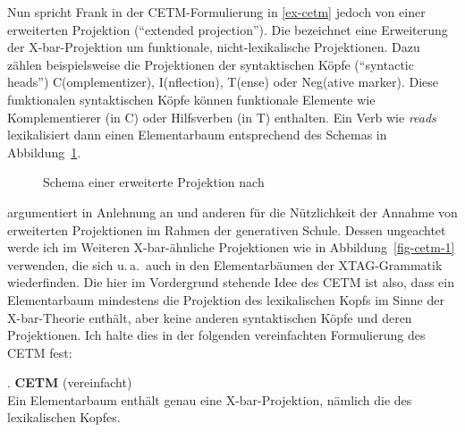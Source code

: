 Nun spricht Frank in der CETM-Formulierung in \ref{ex-cetm} jedoch von einer erweiterten Projektion ("`extended projection"'). Die  \citep{Grimshaw:91,Grimshaw:00}  bezeichnet eine Erweiterung der X-bar-Projektion um funktionale, nicht-lexikalische Projektionen. Dazu zählen beispielsweise die Projektionen der syntaktischen Köpfe ("`syntactic heads"') C(omplemen\-tizer), I(nflection), T(ense) oder Neg(ative marker). Diese funktionalen syntaktischen Köpfe können funktionale Elemente wie Komplementierer (in C) oder Hilfsverben (in T) enthalten. Ein Verb wie {\it reads} lexikalisiert dann einen Elementarbaum entsprechend des Schemas in Abbildung~\ref{fig-cetm-2}.
\begin{figure}[t]
\centering
{}
\caption{\label{fig-cetm-2}Schema einer erweiterte Projektion nach \citet[25]{Frank:02}}
\end{figure}
\citet[45ff]{Frank:02} argumentiert in Anlehnung an \cite{Grimshaw:91} und anderen für die Nützlichkeit der Annahme von erweiterten Projektionen im Rahmen der generativen Schule. Dessen ungeachtet werde ich im Weiteren X-bar-ähnliche Projektionen wie in Abbildung~\ref{fig-cetm-1} verwenden, die sich u.\,a.\ auch in den Elementarbäumen der XTAG-Grammatik wiederfinden. Die hier im Vordergrund stehende Idee des CETM ist also, dass ein Elementarbaum mindestens die Projektion des lexikalischen Kopfs im Sinne der X-bar-Theorie enthält, aber keine anderen syntaktischen Köpfe und deren Projektionen. Ich halte dies in der folgenden vereinfachten Formulierung des CETM fest: 

\ex. \label{ex-cetm-vereinfacht} {\bf CETM} (vereinfacht) \\
Ein Elementarbaum enthält genau eine X-bar-Projektion, nämlich die des lexikalischen Kopfes.

